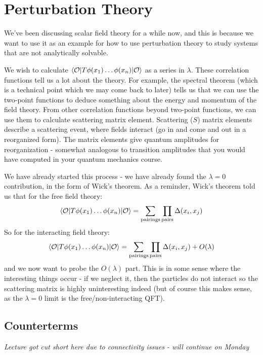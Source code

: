 \section{Perturbation Theory}
We've been discussing scalar field theory for a while now, and this is because we want to use it as an example for how to use perturbation theory to study systems that are not analytically solvable.

We wish to calculate $\bra{\O}T\phi(x_1)\ldots\phi(x_n)\ket{\O}$ as a series in $\lambda$. These correlation functions tell us a lot about the theory. For example, the spectral theorem (which is a technical point which we may come back to later) tells us that we can use the two-point functions to deduce something about the energy and momentum of the field theory. From other correlation functions beyond two-point functions, we can use them to calculate scattering matrix element. Scattering ($S$) matrix elements describe a scattering event, where fields interact (go in and come and out in a reorganized form). The matrix elements give quantum amplitudes for reorganization - somewhat analogous to transition amplitudes that you would have computed in your quantum mechanics course. 

We have already started this process - we have already found the $\lambda = 0$ contribution, in the form of Wick's theorem. As a reminder, Wick's theorem told us that for the free field theory:
\begin{equation}
   \bra{\O}T\phi(x_1)\ldots\phi(x_n)\ket{\O} = \sum_{\text{pairings}}\prod_{\text{pairs}}\Delta(x_i, x_j)
\end{equation}
So for the interacting field theory:
\begin{equation}
    \bra{\O}T\phi(x_1)\ldots\phi(x_n)\ket{\O} = \sum_{\text{pairings}}\prod_{\text{pairs}}\Delta(x_i, x_j) + O(\lambda)
 \end{equation}
and we now want to probe the $O(\lambda)$ part. This is in some sense where the interesting things occur - if we neglect it, then the particles do not interact so the scattering matrix is highly uninteresting indeed (but of course this makes sense, as the $\lambda = 0$ limit is the free/non-interacting QFT). 

\subsection{Counterterms}
\emph{Lecture got cut short here due to connectivity issues - will continue on Monday}

